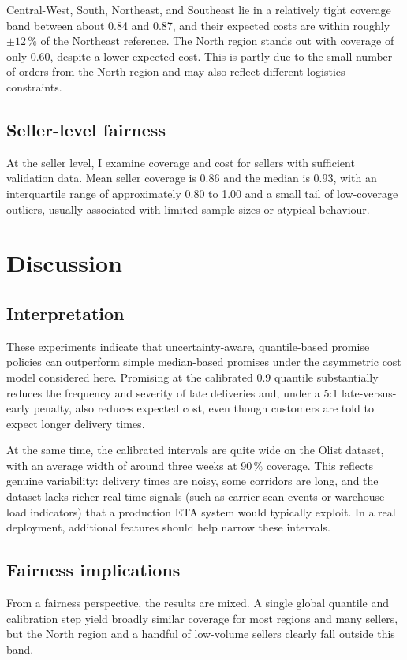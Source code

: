 \documentclass[12pt]{article}
\begin{document}
Central-West, South, Northeast, and Southeast lie in a relatively tight coverage band between about 0.84 and 0.87, and their expected costs are within roughly $\pm 12\,\%$ of the Northeast reference. The North region stands out with coverage of only 0.60, despite a lower expected cost. This is partly due to the small number of orders from the North region and may also reflect different logistics constraints.

\subsection{Seller-level fairness}
At the seller level, I examine coverage and cost for sellers with sufficient validation data. Mean seller coverage is 0.86 and the median is 0.93, with an interquartile range of approximately 0.80 to 1.00 and a small tail of low-coverage outliers, usually associated with limited sample sizes or atypical behaviour.

\section{Discussion}

\subsection{Interpretation}
These experiments indicate that uncertainty-aware, quantile-based promise policies can outperform simple median-based promises under the asymmetric cost model considered here. Promising at the calibrated 0.9 quantile substantially reduces the frequency and severity of late deliveries and, under a 5:1 late-versus-early penalty, also reduces expected cost, even though customers are told to expect longer delivery times.

At the same time, the calibrated intervals are quite wide on the Olist dataset, with an average width of around three weeks at 90\,\% coverage. This reflects genuine variability: delivery times are noisy, some corridors are long, and the dataset lacks richer real-time signals (such as carrier scan events or warehouse load indicators) that a production ETA system would typically exploit. In a real deployment, additional features should help narrow these intervals.

\subsection{Fairness implications}
From a fairness perspective, the results are mixed. A single global quantile and calibration step yield broadly similar coverage for most regions and many sellers, but the North region and a handful of low-volume sellers clearly fall outside this band.
\end{document}
